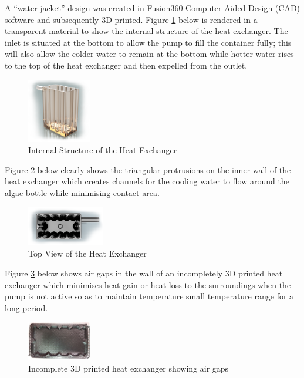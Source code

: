 \documentclass[10pt,a4paper]{IEEEtran}
\begin{document}
 	A ``water jacket'' design was created in Fusion360 Computer Aided Design (CAD) software and subsequently 3D printed. Figure \ref{fig:heat_exchanger_side} below is rendered in a transparent material to show the internal structure of the heat exchanger. The inlet is situated at the bottom to allow the pump to fill the container fully; this will also allow the colder water to remain at the bottom while hotter water rises to the top of the heat exchanger and then expelled from the outlet.
 		\begin{figure}[H]
 			\begin{center}
 				\includegraphics[width=0.25\textwidth]{heat_exchanger_side.png}
 				\caption{Internal Structure of the Heat Exchanger}
 				\label{fig:heat_exchanger_side}
 			\end{center}
 		\end{figure}
 	Figure \ref{fig:heat_exchanger_top} below clearly shows the triangular protrusions on the inner wall of the heat exchanger which creates channels for the cooling water to flow around the algae bottle while minimising contact area.
 		\begin{figure}[H]
 			\begin{center}
 				\includegraphics[width=0.3\textwidth]{heat_exchanger_top.png}
 				\caption{Top View of the Heat Exchanger}
 				\label{fig:heat_exchanger_top}
 			\end{center}
 		\end{figure}
 	Figure \ref{fig:air_gaps} below shows air gaps in the wall of an incompletely 3D printed heat exchanger which minimises heat gain or heat loss to the surroundings when the pump is not active so as to maintain temperature small temperature range for a long period.
 		\begin{figure}[H]
 			\begin{center}
 				\includegraphics[width=0.25\textwidth]{air_gaps.jpeg}
 				\caption{Incomplete 3D printed heat exchanger showing air gaps}
 				\label{fig:air_gaps}
 			\end{center}
 		\end{figure}
\end{document}
